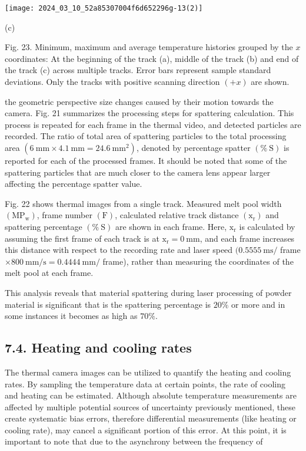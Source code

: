 \documentclass[10pt]{article}
\begin{document}
\begin{center}
\texttt{[image: 2024\_03\_10\_52a85307004f6d652296g-13(2)]}
\end{center}

(c)

Fig. 23. Minimum, maximum and average temperature histories grouped by the $x$ coordinates: At the beginning of the track (a), middle of the track (b) and end of the track (c) across multiple tracks. Error bars represent sample standard deviations. Only the tracks with positive scanning direction $(+x)$ are shown.

the geometric perspective size changes caused by their motion towards the camera. Fig. 21 summarizes the processing steps for spattering calculation. This process is repeated for each frame in the thermal video, and detected particles are recorded. The ratio of total area of spattering particles to the total processing area $\left(6 \mathrm{~mm} \times 4.1 \mathrm{~mm}=24.6 \mathrm{~mm}^{2}\right)$, denoted by percentage spatter $(\% \mathrm{~S})$ is reported for each of the processed frames. It should be noted that some of the spattering particles that are much closer to the camera lens appear larger affecting the percentage spatter value.

Fig. 22 shows thermal images from a single track. Measured melt pool width $\left(\mathrm{MP}_{\mathrm{w}}\right)$, frame number $(\mathrm{F})$, calculated relative track distance $\left(\mathrm{x}_{\mathrm{r}}\right)$ and spattering percentage $(\% \mathrm{~S})$ are shown in each frame. Here, $\mathrm{x}_{\mathrm{r}}$ is calculated by assuming the first frame of each track is at $\mathrm{x}_{\mathrm{r}}=0 \mathrm{~mm}$, and each frame increases this distance with respect to the recording rate and laser speed $(0.5555 \mathrm{~ms} /$ frame $\times 800 \mathrm{~mm} / \mathrm{s}=0.4444 \mathrm{~mm} /$ frame), rather than measuring the coordinates of the melt pool at each frame.

This analysis reveals that material spattering during laser processing of powder material is significant that is the spattering percentage is $20 \%$ or more and in some instances it becomes as high as $70 \%$.

\subsection*{7.4. Heating and cooling rates}
The thermal camera images can be utilized to quantify the heating and cooling rates. By sampling the temperature data at certain points, the rate of cooling and heating can be estimated. Although absolute temperature measurements are affected by multiple potential sources of uncertainty previously mentioned, these create systematic bias errors, therefore differential measurements (like heating or cooling rate), may cancel a significant portion of this error. At this point, it is important to note that due to the asynchrony between the frequency of
\end{document}
